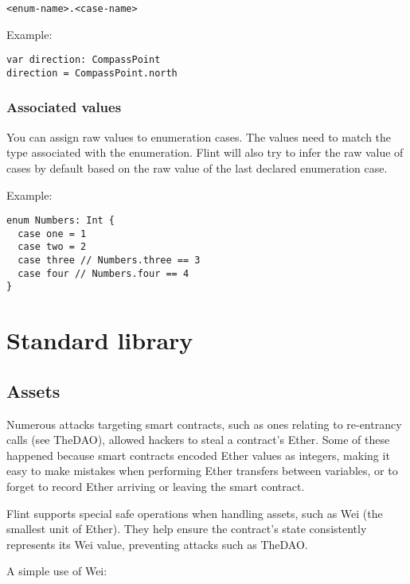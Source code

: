\begin{verbatim}
<enum-name>.<case-name>
\end{verbatim}

Example:

\begin{verbatim}
var direction: CompassPoint
direction = CompassPoint.north
\end{verbatim}

\subsubsection{Associated values}
\label{sec:appendix-b-associated-values}

You can assign raw values to enumeration cases. The values need to match the type associated with the enumeration. Flint will also try to infer the raw value of cases by default based on the raw value of the last declared enumeration case.

Example:

\begin{verbatim}
enum Numbers: Int {
  case one = 1
  case two = 2
  case three // Numbers.three == 3
  case four // Numbers.four == 4
}
\end{verbatim}

\section{Standard library}
\label{sec:appendix-b-standard-library}

\subsection{Assets}
\label{sec:appendix-b-assets}

Numerous attacks targeting smart contracts, such as ones relating to re-entrancy calls (see TheDAO), allowed hackers to steal a contract’s Ether. Some of these happened because smart contracts encoded Ether values as integers, making it easy to make mistakes when performing Ether transfers between variables, or to forget to record Ether arriving or leaving the smart contract.

Flint supports special safe operations when handling assets, such as Wei (the smallest unit of Ether). They help ensure the contract's state consistently represents its Wei value, preventing attacks such as TheDAO.

A simple use of Wei:


